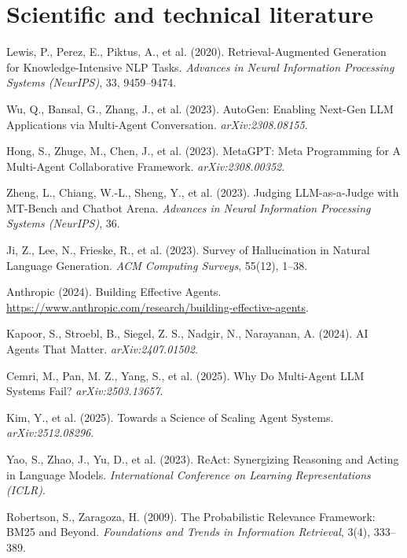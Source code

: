 \newcommand{\nguon}[2]{\par\noindent\hangindent=1.1cm\hangafter=1\hypertarget{src-#1}{}\makebox[1.1cm][l]{[#1]}#2\par\vspace{5pt}}

\section*{Scientific and technical literature}

\nguon{1}{Lewis, P., Perez, E., Piktus, A., et al. (2020). Retrieval-Augmented Generation for Knowledge-Intensive NLP Tasks. \textit{Advances in Neural Information Processing Systems (NeurIPS)}, 33, 9459--9474.}

\nguon{2}{Wu, Q., Bansal, G., Zhang, J., et al. (2023). AutoGen: Enabling Next-Gen LLM Applications via Multi-Agent Conversation. \textit{arXiv:2308.08155}.}

\nguon{3}{Hong, S., Zhuge, M., Chen, J., et al. (2023). MetaGPT: Meta Programming for A Multi-Agent Collaborative Framework. \textit{arXiv:2308.00352}.}

\nguon{4}{Zheng, L., Chiang, W.-L., Sheng, Y., et al. (2023). Judging LLM-as-a-Judge with MT-Bench and Chatbot Arena. \textit{Advances in Neural Information Processing Systems (NeurIPS)}, 36.}

\nguon{5}{Ji, Z., Lee, N., Frieske, R., et al. (2023). Survey of Hallucination in Natural Language Generation. \textit{ACM Computing Surveys}, 55(12), 1--38.}

\nguon{6}{Anthropic (2024). Building Effective Agents. \url{https://www.anthropic.com/research/building-effective-agents}.}

\nguon{7}{Kapoor, S., Stroebl, B., Siegel, Z. S., Nadgir, N., Narayanan, A. (2024). AI Agents That Matter. \textit{arXiv:2407.01502}.}

\nguon{8}{Cemri, M., Pan, M. Z., Yang, S., et al. (2025). Why Do Multi-Agent LLM Systems Fail? \textit{arXiv:2503.13657}.}

\nguon{9}{Kim, Y., et al. (2025). Towards a Science of Scaling Agent Systems. \textit{arXiv:2512.08296}.}

\nguon{10}{Yao, S., Zhao, J., Yu, D., et al. (2023). ReAct: Synergizing Reasoning and Acting in Language Models. \textit{International Conference on Learning Representations (ICLR)}.}

\nguon{11}{Robertson, S., Zaragoza, H. (2009). The Probabilistic Relevance Framework: BM25 and Beyond. \textit{Foundations and Trends in Information Retrieval}, 3(4), 333--389.}

